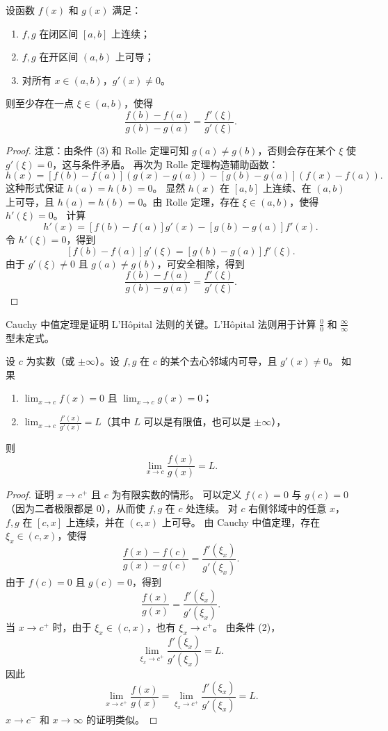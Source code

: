\begin{theorem}
\label{thm:cauchy_mvt_cn}
设函数 $f(x)$ 和 $g(x)$ 满足：
\begin{enumerate}
    \item $f,g$ 在闭区间 $[a,b]$ 上连续；
    \item $f,g$ 在开区间 $(a,b)$ 上可导；
    \item 对所有 $x\in(a,b)$，$g'(x)\ne 0$。
\end{enumerate}
则至少存在一点 $\xi\in(a,b)$，使得
\[
\frac{f(b)-f(a)}{g(b)-g(a)}=\frac{f'(\xi)}{g'(\xi)}.
\]
\end{theorem}

\begin{proof}
注意：由条件 (3) 和 Rolle 定理可知 $g(a)\ne g(b)$，否则会存在某个 $\xi$ 使 $g'(\xi)=0$，这与条件矛盾。
再次为 Rolle 定理构造辅助函数：
\[
h(x)=[f(b)-f(a)](g(x)-g(a))-[g(b)-g(a)](f(x)-f(a)).
\]
这种形式保证 $h(a)=h(b)=0$。
显然 $h(x)$ 在 $[a,b]$ 上连续、在 $(a,b)$ 上可导，且 $h(a)=h(b)=0$。由 Rolle 定理，存在 $\xi\in(a,b)$，使得 $h'(\xi)=0$。
计算
\[
h'(x)=[f(b)-f(a)]g'(x)-[g(b)-g(a)]f'(x).
\]
令 $h'(\xi)=0$，得到
\[
[f(b)-f(a)]g'(\xi)=[g(b)-g(a)]f'(\xi).
\]
由于 $g'(\xi)\ne 0$ 且 $g(a)\ne g(b)$，可安全相除，得到
\[
\frac{f(b)-f(a)}{g(b)-g(a)}=\frac{f'(\xi)}{g'(\xi)}.
\]
\end{proof}

Cauchy 中值定理是证明 L'Hôpital 法则的关键。L'Hôpital 法则用于计算 $\frac{0}{0}$ 和 $\frac{\infty}{\infty}$ 型未定式。

\begin{theorem}
\label{thm:lhopital_zero_cn}
设 $c$ 为实数（或 $\pm\infty$）。设 $f,g$ 在 $c$ 的某个去心邻域内可导，且 $g'(x)\ne 0$。
如果
\begin{enumerate}
    \item $\lim_{x\to c}f(x)=0$ 且 $\lim_{x\to c}g(x)=0$；
    \item $\lim_{x\to c}\frac{f'(x)}{g'(x)}=L$（其中 $L$ 可以是有限值，也可以是 $\pm\infty$），
\end{enumerate}
则
\[
\lim_{x\to c}\frac{f(x)}{g(x)}=L.
\]
\end{theorem}

\begin{proof}
证明 $x\to c^+$ 且 $c$ 为有限实数的情形。
可以定义 $f(c)=0$ 与 $g(c)=0$（因为二者极限都是 $0$），从而使 $f,g$ 在 $c$ 处连续。
对 $c$ 右侧邻域中的任意 $x$，$f,g$ 在 $[c,x]$ 上连续，并在 $(c,x)$ 上可导。
由 Cauchy 中值定理，存在 $\xi_x\in(c,x)$，使得
\[
\frac{f(x)-f(c)}{g(x)-g(c)}=\frac{f'(\xi_x)}{g'(\xi_x)}.
\]
由于 $f(c)=0$ 且 $g(c)=0$，得到
\[
\frac{f(x)}{g(x)}=\frac{f'(\xi_x)}{g'(\xi_x)}.
\]
当 $x\to c^+$ 时，由于 $\xi_x\in(c,x)$，也有 $\xi_x\to c^+$。
由条件 (2)，
\[
\lim_{\xi_x\to c^+}\frac{f'(\xi_x)}{g'(\xi_x)}=L.
\]
因此
\[
\lim_{x\to c^+}\frac{f(x)}{g(x)}=\lim_{\xi_x\to c^+}\frac{f'(\xi_x)}{g'(\xi_x)}=L.
\]
$x\to c^-$ 和 $x\to\infty$ 的证明类似。
\end{proof}



